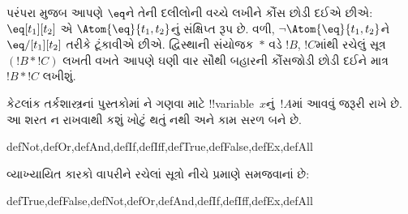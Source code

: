 \documentclass[../../../include/open-logic-section]{subfiles}
\begin{document}
પરંપરા મુજબ આપણે $\eq$ને તેની દલીલોની વચ્ચે લખીને કૌંસ છોડી દઈએ
છીએ: $\eq[t_1][t_2]$ એ $\Atom{\eq}{t_1,t_2}$નું સંક્ષિપ્ત રૂપ છે.
વળી, $\lnot \Atom{\eq}{t_1,t_2}$ને $\eq/[t_1][t_2]$ તરીકે ટૂંકાવીએ
છીએ. દ્વિસ્થાની સંયોજક~$\ast$ વડે $!B$, $!C$માંથી રચેલું સૂત્ર
$(!B \ast !C)$ લખતી વખતે આપણે ઘણી વાર સૌથી બહારની કૌંસજોડી છોડી
દઈને માત્ર~$!B \ast !C$ લખીશું.

\begin{intro}
કેટલાંક તર્કશાસ્ત્રનાં પુસ્તકોમાં
%
%
%
ને
ગણવા માટે !!{variable}~$x$નું~$!A$માં આવવું જરૂરી રાખે છે. આ શરત
ન રાખવાથી કશું ખોટું થતું નથી અને કામ સરળ બને છે.
\end{intro}

\begin{tagblock}{defNot,defOr,defAnd,defIf,defIff,defTrue,defFalse,defEx,defAll}
\begin{defn}
વ્યાખ્યાયિત કારકો વાપરીને રચેલાં સૂત્રો નીચે પ્રમાણે સમજવાનાં છે:

\begin{tagenumerate}{defTrue,defFalse,defNot,defOr,defAnd,defIf,defIff,defEx,defAll}









\end{tagenumerate}
\end{defn}
\end{tagblock}
\end{document}
